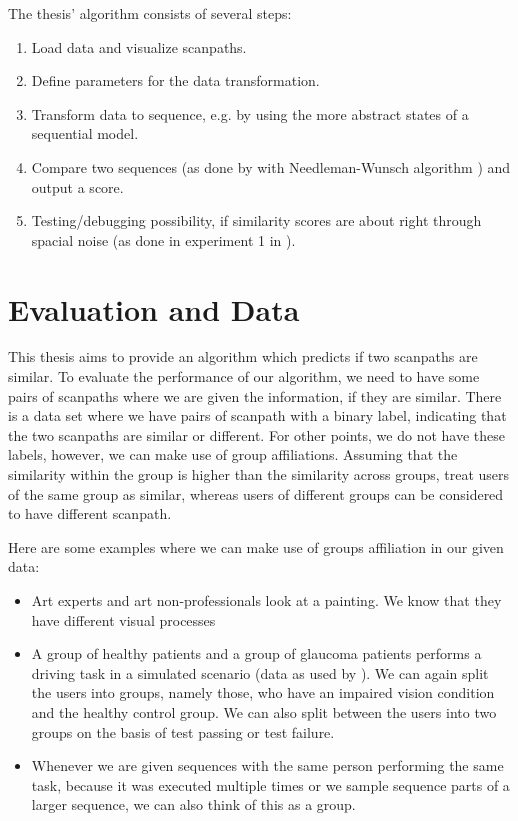 \documentclass[
        a4paper,     %
        parskip      %
        ]{scrartcl} %
\begin{document}
The thesis' algorithm consists of several steps: %
\begin{enumerate} \itemsep {}
    \item Load data and visualize scanpaths.
    \item Define parameters for the data transformation. 
    \item Transform data to sequence, e.g. by using the more abstract states of a sequential model. %
    \item Compare two sequences (as done by \cite{CristinoEtAl2010} with Needleman-Wunsch algorithm \cite{needleman1970general}) and output a score.
    \item Testing/debugging possibility, if similarity scores are about right through spacial noise (as done in experiment 1 in \cite{dewhurst2012depends}). 
\end{enumerate}

  \section{Evaluation and Data}
  
  
This thesis aims to provide an algorithm which predicts if two scanpaths are similar. 
To evaluate the performance of our algorithm, we need to have some pairs of scanpaths where we are given the information, if they are similar. 
There is a data set where we have pairs of scanpath with a binary label, indicating that the two scanpaths are similar or different.  
For other points, we do not have these labels, however, we can make use of group affiliations. Assuming that the similarity within the group is higher than the similarity across groups, treat users of the same group as similar, whereas users of different groups can be considered to have different scanpath.

Here are some examples where we can make use of groups affiliation in our given data:
\begin{itemize} \itemsep {}
\item Art experts and art non-professionals look at a painting. We know that they have different visual processes 
\item A group of healthy patients and a group of glaucoma patients performs a driving task in a simulated scenario (data as used by \cite{SubsMatch}). 
We can again split the users into groups, namely those, who have an impaired vision condition and the healthy control group. We can also split between the users into two groups on the basis of test passing or test failure. 
\item Whenever we are given sequences with the same person performing the same task, because it was executed multiple times or we sample sequence parts of a larger sequence, we can also think of this as a group.
\end{itemize}
  
\end{document}
